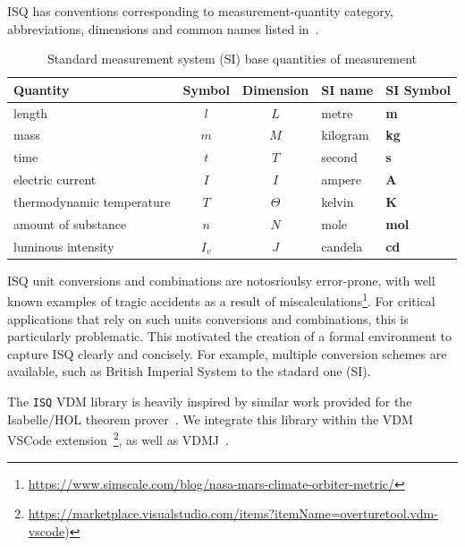 \documentclass[runningheads,a4paper]{llncs}
\begin{document}
\gls{ISQ} has conventions corresponding to measurement-quantity category, abbreviations, dimensions and common names listed in~.
%
\begin{table}[htbp]
    \centering
    \begin{tabular}{lccll}
        \toprule 
        \textbf{Quantity}         & \textbf{Symbol}& \textbf{Dimension}  & \textbf{SI name} & \textbf{SI Symbol}  \\ \hline 
        length                    & \(l\)          & \(L\)        &  metre	   & \textbf{m}   \\ \midrule
        mass                      & \(m\)	       & \(M\)	      &  kilogram  & \textbf{kg}  \\ \midrule
        time                      & \(t\)          & \(T\)        &  second    & \textbf{s}   \\ \midrule 
        electric current          & \(I\)	       & \(I\)	      &  ampere    & \textbf{A}	  \\ \midrule 
        thermodynamic temperature & \(T\)	       & \(\Theta\)   &  kelvin    & \textbf{K}	  \\ \midrule
        amount of substance       & \(n\)          & \(N\)        &  mole      & \textbf{mol} \\ \midrule
        luminous intensity        & \(I_v\)	       & \(J\)	      &  candela   & \textbf{cd}  \\
        \bottomrule
    \end{tabular}
    \caption{Standard measurement system (SI) base quantities of measurement}\label{tbl:SI}
\end{table} 

\gls{ISQ} unit conversions and combinations are notosrioulsy error-prone, with well known examples of tragic accidents as a result of miscalculations\footnote{\url{https://www.simscale.com/blog/nasa-mars-climate-orbiter-metric/}}. For critical applications that rely on such units conversions and combinations, this is particularly problematic. This motivated the creation of a formal environment to capture ISQ clearly and concisely. For example, multiple conversion schemes are available, such as British Imperial System to the stadard one (SI).       

The \texttt{ISQ} VDM library is heavily inspired by similar work provided for the Isabelle/HOL theorem prover~\cite{Physical_Quantities-AFP}. We integrate this library within the VDM VSCode extension~\footnote{\url{https://marketplace.visualstudio.com/items?itemName=overturetool.vdm-vscode})}, as well as VDMJ~\cite{Battle09}.
\end{document}
